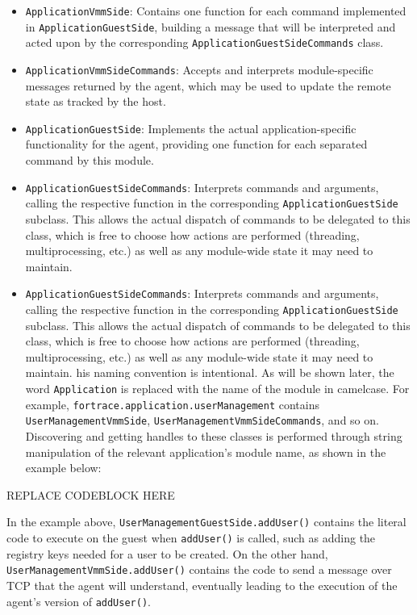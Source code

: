 \begin{itemize}
\item
  \texttt{ApplicationVmmSide}: Contains one function for each command
  implemented in \texttt{ApplicationGuestSide}, building a message that
  will be interpreted and acted upon by the corresponding
  \texttt{ApplicationGuestSideCommands} class.
\item
  \texttt{ApplicationVmmSideCommands}: Accepts and interprets
  module-specific messages returned by the agent, which may be used to
  update the remote state as tracked by the host.
\item
  \texttt{ApplicationGuestSide}: Implements the actual
  application-specific functionality for the agent, providing one
  function for each separated command by this module.
\item
  \texttt{ApplicationGuestSideCommands}: Interprets commands and
  arguments, calling the respective function in the corresponding
  \texttt{ApplicationGuestSide} subclass. This allows the actual
  dispatch of commands to be delegated to this class, which is free to
  choose how actions are performed (threading, multiprocessing, etc.) as
  well as any module-wide state it may need to maintain.
\item
  \texttt{ApplicationGuestSideCommands}: Interprets commands and
  arguments, calling the respective function in the corresponding
  \texttt{ApplicationGuestSide} subclass. This allows the actual
  dispatch of commands to be delegated to this class, which is free to
  choose how actions are performed (threading, multiprocessing, etc.) as
  well as any module-wide state it may need to maintain. his naming
  convention is intentional. As will be shown later, the word
  \texttt{Application} is replaced with the name of the module in
  camelcase. For example, \texttt{fortrace.application.userManagement}
  contains \texttt{UserManagementVmmSide},
  \texttt{UserManagementVmmSideCommands}, and so on. Discovering and
  getting handles to these classes is performed through string
  manipulation of the relevant application's module name, as shown in
  the example below:
\end{itemize}

REPLACE CODEBLOCK HERE

In the example above, \texttt{UserManagementGuestSide.addUser()}
contains the literal code to execute on the guest when
\texttt{addUser()} is called, such as adding the registry keys needed
for a user to be created. On the other hand,
\texttt{UserManagementVmmSide.addUser()} contains the code to send a
message over TCP that the agent will understand, eventually leading to
the execution of the agent's version of \texttt{addUser()}.

